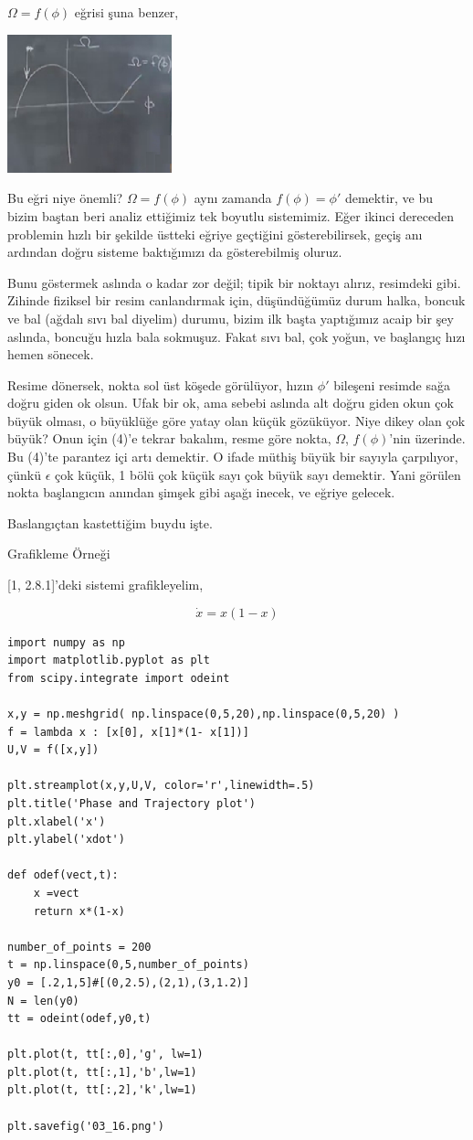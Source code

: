 \documentclass[12pt,fleqn]{article}\usepackage{../../common}
\begin{document}
$\Omega = f(\phi)$ eğrisi şuna benzer,

\includegraphics[height=4cm]{03_08.png}

Bu eğri niye önemli? $\Omega = f(\phi)$ aynı zamanda $f(\phi) = \phi'$ demektir,
ve bu bizim baştan beri analiz ettiğimiz tek boyutlu sistemimiz. Eğer ikinci
dereceden problemin hızlı bir şekilde üstteki eğriye geçtiğini gösterebilirsek,
geçiş anı ardından doğru sisteme baktığımızı da gösterebilmiş oluruz.

Bunu göstermek aslında o kadar zor değil; tipik bir noktayı alırız, resimdeki
gibi. Zihinde fiziksel bir resim canlandırmak için, düşündüğümüz durum halka,
boncuk ve bal (ağdalı sıvı bal diyelim) durumu, bizim ilk başta yaptığımız acaip
bir şey aslında, boncuğu hızla bala sokmuşuz. Fakat sıvı bal, çok yoğun, ve
başlangıç hızı hemen sönecek. 

Resime dönersek, nokta sol üst köşede görülüyor, hızın $\phi'$ bileşeni resimde
sağa doğru giden ok olsun. Ufak bir ok, ama sebebi aslında alt doğru giden okun
çok büyük olması, o büyüklüğe göre yatay olan küçük gözüküyor. Niye dikey olan
çok büyük? Onun için (4)'e tekrar bakalım, resme göre nokta, $\Omega$,
$f(\phi)$'nin üzerinde. Bu (4)'te parantez içi artı demektir. O ifade müthiş
büyük bir sayıyla çarpılıyor, çünkü $\epsilon$ çok küçük, 1 bölü çok küçük sayı
çok büyük sayı demektir. Yani görülen nokta başlangıcın anından şimşek gibi
aşağı inecek, ve eğriye gelecek. 

Baslangıçtan kastettiğim buydu işte. 

Grafikleme Örneği

[1, 2.8.1]'deki sistemi grafikleyelim,

$$ \dot{x} = x(1-x)$$ 

\begin{verbatim}
import numpy as np
import matplotlib.pyplot as plt
from scipy.integrate import odeint

x,y = np.meshgrid( np.linspace(0,5,20),np.linspace(0,5,20) )
f = lambda x : [x[0], x[1]*(1- x[1])]
U,V = f([x,y])

plt.streamplot(x,y,U,V, color='r',linewidth=.5)
plt.title('Phase and Trajectory plot')
plt.xlabel('x')
plt.ylabel('xdot')

def odef(vect,t):
    x =vect
    return x*(1-x)

number_of_points = 200
t = np.linspace(0,5,number_of_points)
y0 = [.2,1,5]#[(0,2.5),(2,1),(3,1.2)]
N = len(y0)
tt = odeint(odef,y0,t)

plt.plot(t, tt[:,0],'g', lw=1)
plt.plot(t, tt[:,1],'b',lw=1)
plt.plot(t, tt[:,2],'k',lw=1)

plt.savefig('03_16.png')
\end{verbatim}
\end{document}
